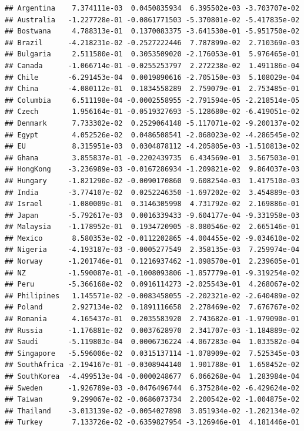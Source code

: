 \documentclass[11pt,preprint, authoryear]{elsarticle}
\numberwithin{equation}{section}
\numberwithin{figure}{section}
\numberwithin{table}{section}
\begin{document}
\begin{verbatim}
## Argentina    7.374111e-03  0.0450835934  6.395502e-03 -3.703707e-02
## Australia   -1.227728e-01 -0.0861771503 -5.370801e-02 -5.417835e-02
## Bostwana     4.788313e-01  0.1370083375 -3.641530e-01 -5.951750e-02
## Brazil      -4.218231e-02 -0.2527222446  7.787899e-02  2.710369e-03
## Bulgaria     2.511580e-01  0.3053509020 -2.176053e-01  5.976465e-01
## Canada      -1.066714e-01 -0.0255253797  2.272238e-02  1.491186e-04
## Chile       -6.291453e-04  0.0019890616 -2.705150e-03  5.108029e-04
## China       -4.080112e-01  0.1834558289  2.759079e-01  2.753485e-01
## Columbia     6.511198e-04 -0.0002558955 -2.791594e-05 -2.218514e-05
## Czech        1.956164e-01 -0.0519327693 -5.128680e-02 -6.419051e-02
## Denmark      7.733302e-02  0.2529064148 -5.117071e-02 -9.200137e-02
## Egypt        4.052526e-02  0.0486508541 -2.068023e-02 -4.286545e-02
## EU           8.315951e-03  0.0304878112 -4.205805e-03 -1.510813e-02
## Ghana        3.855837e-01 -0.2202439735  6.434569e-01  3.567503e-01
## HongKong    -3.236989e-03 -0.0167286934 -1.209821e-02  9.864037e-03
## Hungary     -1.821290e-02 -0.0090170860  9.608254e-03  1.417510e-03
## India       -3.774107e-02  0.0252246350 -1.697202e-02  3.454889e-03
## Israel      -1.080009e-01  0.3146305998  4.731792e-02  2.169886e-01
## Japan       -5.792617e-03  0.0016339433 -9.604177e-04 -9.331958e-03
## Malaysia    -1.178952e-01  0.1934720905 -8.080546e-02  2.665146e-01
## Mexico       8.580353e-02 -0.0112202865 -4.004455e-02 -9.034610e-02
## Nigeria     -4.193187e-03 -0.0005277549  2.358135e-03  7.259974e-04
## Norway      -1.201746e-01  0.1216937462 -1.098570e-01  2.239605e-01
## NZ          -1.590087e-01 -0.1008093806 -1.857779e-01 -9.319254e-02
## Peru        -5.366168e-02  0.0916114273 -2.025543e-01  4.268067e-02
## Philipines   1.145571e-02 -0.0083458055 -2.202321e-02 -2.640489e-02
## Poland       2.927134e-02  0.1891116658  2.278469e-02  7.676767e-02
## Romania      4.165437e-01  0.2035583920  2.743682e-01 -1.979090e-01
## Russia      -1.176881e-02  0.0037628970  2.341707e-03 -1.184889e-02
## Saudi       -5.119803e-04  0.0006736224 -4.067283e-04  1.033582e-04
## Singapore   -5.596006e-02  0.0315137114 -1.078909e-02  7.525345e-03
## SouthAfrica -2.194167e-01 -0.0308944140  1.901788e-01  1.658452e-02
## SouthKorea  -4.499513e-04 -0.0000248677  6.066268e-04  1.283984e-04
## Sweden      -1.926789e-03 -0.0476496744  6.375284e-02 -6.429624e-02
## Taiwan       9.299067e-02 -0.0686073734  2.200542e-02 -1.004875e-02
## Thailand    -3.013139e-02 -0.0054027898  3.051934e-02 -1.202134e-02
## Turkey       7.133726e-02 -0.6359827954 -3.126946e-01  4.181446e-01

\end{verbatim}
\end{document}
